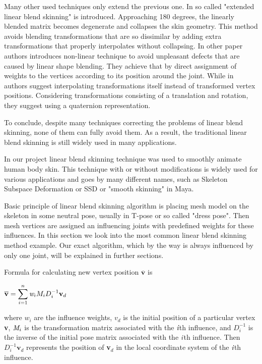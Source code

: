 \documentclass[times, 10pt,twocolumn]{article}
\begin{document}
Many other used techniques only extend the previous one. In \cite{ex2} so called "extended linear blend skinning" is introduced. Approaching 180 degrees, the linearly blended matrix becomes degenerate and collapses the skin geometry. This method avoids blending transformations that are so dissimilar by adding extra transformations that properly interpolates
without collapsing. In other paper \cite{ex8} authors introduces non-linear technique to avoid unpleasant defects that are caused by linear shape blending. They achieve that by direct assignment of weights to the
vertices according to its position around the joint. While in \cite{ex10} authors suggest interpolating transformations itself instead of transformed vertex positions. Considering transformations consisting of a translation and rotation, they suggest using a quaternion representation.

To conclude, despite many techniques correcting the problems of linear blend skinning, none of them can fully avoid them. As a result, the traditional linear blend skinning is still widely used in many applications.

\label{Linear_blend_skinning}

In our project linear blend skinning technique was used to smoothly animate human body skin.
This technique with or without modifications is widely used for various applications and goes by many different names, such as Skeleton Subspace Deformation or SSD or "smooth skinning" in Maya.

Basic principle of linear blend skinning algorithm is placing mesh model on the skeleton in some neutral pose, usually in T-pose or so called "dress pose". Then mesh vertices are assigned an influencing joints with predefined weights for these influences. In this section we look into the most common linear blend skinning method example. Our exact algorithm, which by the way is always influenced by only one joint, will be explained in further sections.

Formula for calculating new vertex position $ \overline{\textbf{v}} $ is
\begin{center}
$ \overline{\textbf{v}} = \displaystyle\sum_{i=1}^n\emph{w}_{i}M_{i}D_{i}^{-1}\textbf{v}_{d} $
\end{center}
where $w_{i}$ are the influence weights, $v_{d}$ is the initial position of a
particular vertex \textbf{v}, $\emph{M}_{i}$ is the transformation matrix associated with
the $\emph{i}$th influence, and $D_{i}^{-1}$ is the inverse of the initial pose matrix
associated with the $\emph{i}$th influence. Then $D_{i}^{-1}\textbf{v}_{d}$ represents
the position of \textbf{v$_{d}$} in the local coordinate system of the $\emph{i}$th influence.
\end{document}
